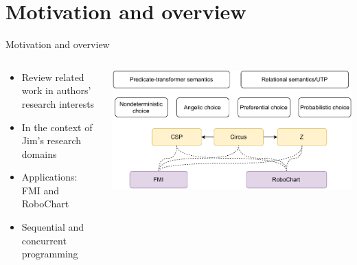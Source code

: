 \documentclass[%
    slidestop,%
    compress,%
    mathserif,%
    table,%
    usenames,%
    aspectratio=169,
    dvipsnames,%
]{beamer}%
\begin{document}
\section{Motivation and overview}
\begin{frame}{Motivation and overview}
    \begin{columns}%
        \begin{column}[t]{0.55\textwidth}%
            \begin{itemize}%
                \item Review related work in authors' research interests%
                \item In the context of Jim's research domains%
                \item Applications: FMI and RoboChart
                \item Sequential and concurrent programming
            \end{itemize}%
        \end{column}%
        \begin{column}[t]{0.45\textwidth}%
            \begin{center}%
                \includegraphics[width=\textwidth]{pics/overall.pdf}%
            \end{center}%
        \end{column}%
    \end{columns}
\end{frame}
\end{document}
